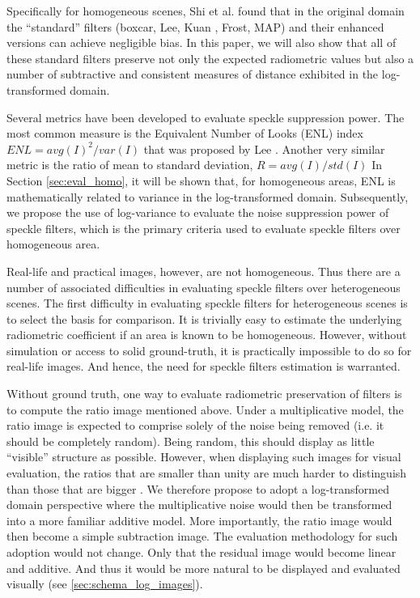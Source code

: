 Specifically for homogeneous scenes, Shi et al. \cite{Shi_IGARSS_1994} found that 
	in the original domain the ``standard'' filters (boxcar, Lee\cite{Lee_PAMI_1980}, 
	Kuan \cite{Kuan_1985_PAMI}, Frost\cite{Frost_PAMI_1982}, 
	MAP\cite{Lopes_IGARSS_1990}) and their enhanced versions \cite{Lopes_TGRS_1990} can achieve negligible bias. 
In this paper, we will also show that all of these standard filters preserve
	not only the expected radiometric values
	but also a number of subtractive and consistent measures of distance exhibited in the log-transformed domain.

Several metrics have been developed to evaluate speckle suppression power.
The most common measure is the Equivalent Number of Looks (ENL) index 
$ENL=avg(I)^2/var(I)$
that was proposed by Lee \cite{Lee_1981_CGIP}.
Another very similar metric is the ratio of mean to standard deviation, $R=avg(I)/std(I)$ \cite{Gagnon_SPIEProc_1997} 
In Section \ref{sec:eval_homo}, it will be shown that, for homogeneous areas, ENL is mathematically related to variance in the 
	log-transformed domain.
Subsequently, we propose the use of log-variance to evaluate the noise suppression power of speckle filters, 
	which is the primary criteria used to evaluate speckle filters over homogeneous area.

Real-life and practical images, however, are not homogeneous.
Thus there are a number of associated difficulties in evaluating speckle filters over heterogeneous scenes.
The first difficulty in evaluating speckle filters for heterogeneous scenes is to select the basis for comparison. 
It is trivially easy to estimate the underlying radiometric coefficient if an area is known to be homogeneous.
However, without simulation or access to solid ground-truth, it is practically impossible to do so for 
	real-life images.
And hence, the need for speckle filters estimation is warranted.

Without ground truth, one way to evaluate radiometric preservation of filters is to compute the ratio image mentioned above. 
Under a multiplicative model, the ratio image is expected to comprise solely of
    the noise being removed (i.e. it should be completely random). 
Being random, this should display as little ``visible'' structure as possible. 
However, when displaying such images for visual evaluation, the ratios that are smaller than unity are much 
harder to distinguish than those that are bigger \cite{Medeiros_2003_IJRS}. 
We therefore propose to adopt a log-transformed domain perspective 
  where the multiplicative noise would then be transformed into a more familiar additive model.
More importantly, the ratio image would then become a simple subtraction image.
The evaluation methodology for such adoption would not change. 
Only that the residual image would become linear and additive.
And thus it would be more natural to be displayed and evaluated visually (see \ref{sec:schema_log_images}).

